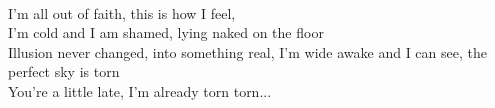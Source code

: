 \\
I'm all out of faith, this is how I feel, \\
I'm cold and I am shamed, lying naked on the floor \\
Illusion never changed, into something real,
I'm wide awake and I can see, the perfect sky is torn \\
You're a little late, I'm already torn
torn...
